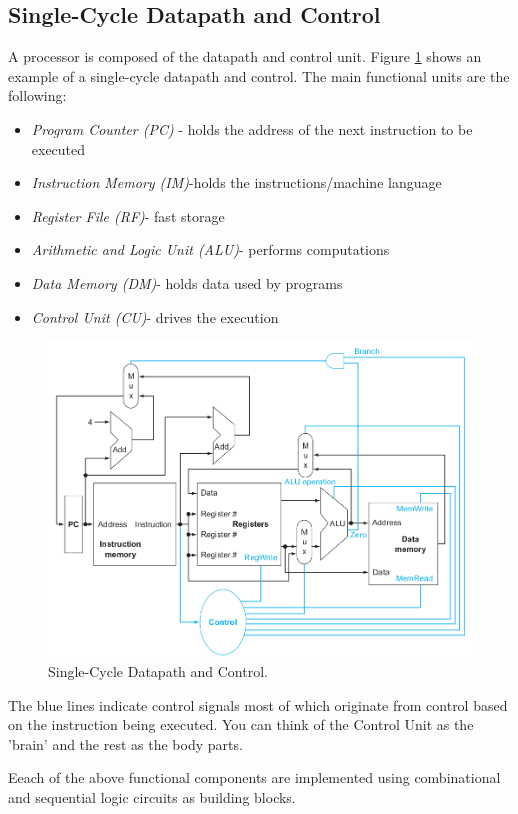 \documentclass[a4paper, 11pt,oneside]{article}
\begin{document}
\subsection{Single-Cycle Datapath and Control}
A processor is composed of the datapath and control unit. Figure \ref{fig:datapath} shows an example of a 
single-cycle datapath and control. The main functional units are the following:
\begin{itemize}
	\item{\textit{Program Counter (PC)} - holds the address of the next instruction to be executed}
	\item{\textit{Instruction Memory (IM)}-holds the instructions/machine language}
	\item{\textit{Register File (RF)}- fast storage}
	\item{\textit{Arithmetic and Logic Unit (ALU)}- performs computations}
	\item{\textit{Data Memory (DM)}- holds data used by programs}
	\item{\textit{Control Unit (CU)}- drives the execution }
\end{itemize}
\begin{figure}
	\includegraphics[width=\linewidth]{single-cycle-dp-control.png}
	\caption{Single-Cycle Datapath and Control.}
	\label{fig:datapath}
\end{figure}
The blue lines indicate control signals most of which originate from control based on the instruction being executed. You can think of the Control Unit as the 'brain' and the rest as the body parts.

Eeach of the above functional components are implemented using combinational and sequential logic circuits as building blocks. 
\end{document}
